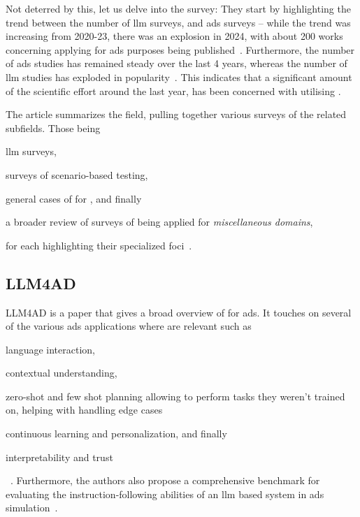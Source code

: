 Not deterred by this, let us delve into the survey:
They start by highlighting the trend between the number of \acrshort{llm} surveys, and
\acrshort{ads} surveys -- while the trend was increasing from 2020-23, there was an explosion in
\num{2024}, with about \num{200} works concerning applying  for \acrlong{ads}
purposes being published~\cite[p. 1, figure (b)]{surveyLLMScenarioBasedTesting}. Furthermore, the
number of \acrshort{ads} studies has remained steady over the last \num{4}  years, whereas the number
of \acrshort{llm} studies has exploded in popularity~\cite[p. 1, figure
    (a)]{surveyLLMScenarioBasedTesting}. This indicates that a significant amount of the scientific
effort around  the last year, has been concerned with utilising .

The article summarizes the field, pulling together various surveys of the
related subfields. Those being \begin{inparaenum}
    \item \acrshort{llm} surveys,
    \item surveys of scenario-based testing,
    \item general cases of  for , and finally
    \item a broader review of surveys of  being applied for
    \textit{miscellaneous domains},
\end{inparaenum}
for each highlighting their specialized
foci~\cite[2]{surveyLLMScenarioBasedTesting}.

\subsection{LLM4AD}

LLM4AD is a paper that gives a broad overview of  for \acrlong{ads}. It touches on
several of the various \acrshort{ads} applications where  are relevant such as
\begin{inparaenum}
    \item language interaction,
    \item contextual understanding,
    \item zero-shot and few shot planning allowing  to perform tasks they weren't trained
    on, helping with handling edge cases
    \item continuous learning and personalization, and finally
    \item interpretability and trust \end{inparaenum}~\cite[2]{LLM4AD}. Furthermore, the authors
also propose a comprehensive benchmark for evaluating the instruction-following abilities of an
\acrshort{llm} based system in \acrshort{ads} simulation~\cite[1]{LLM4AD}.


